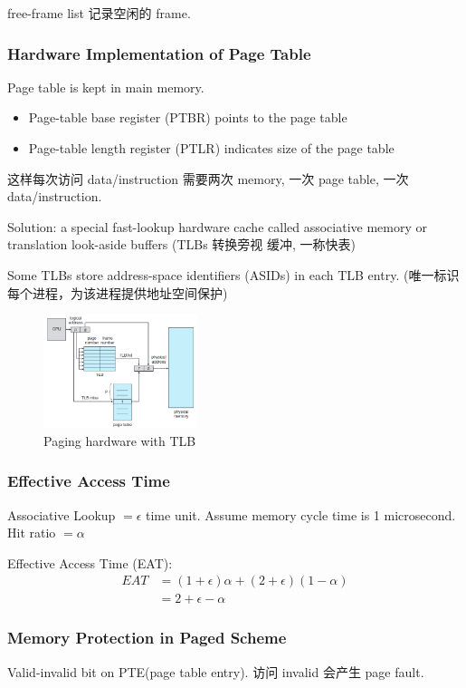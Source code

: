 free-frame list 记录空闲的 frame. 

\subsubsection{Hardware Implementation of Page Table}
Page table is kept in main memory. 
\begin{itemize}\small
    \item Page-table base register (PTBR) points to the page table
    \item Page-table length register (PTLR) indicates size of the page table
\end{itemize}
这样每次访问 data/instruction 需要两次 memory, 一次 page table, 一次 data/instruction.

Solution: a special fast-lookup hardware cache called associative
memory or translation look-aside buffers (TLBs 转换旁视
缓冲, 一称快表)

Some TLBs store address-space identifiers (ASIDs) in
each TLB entry. (唯一标识每个进程，为该进程提供地址空间保护)

\begin{figure}[!htb]
    \centering
    \includegraphics[width=0.4\textwidth]{pic/OS8/Paging hardware with TLB}
    \caption{Paging hardware with TLB}
\end{figure}

\subsubsection{Effective Access Time}
Associative Lookup $=\epsilon$ time unit. Assume memory cycle time is 1 microsecond. Hit ratio $=\alpha$

Effective Access Time (EAT):
\begin{align*}
    EAT &= (1+\epsilon)\alpha+(2+\epsilon)(1-\alpha)\\
    &=2+\epsilon -\alpha
\end{align*}

\subsubsection{Memory Protection in Paged Scheme}
Valid-invalid bit on PTE(page table entry). 访问 invalid 会产生 page fault. 

